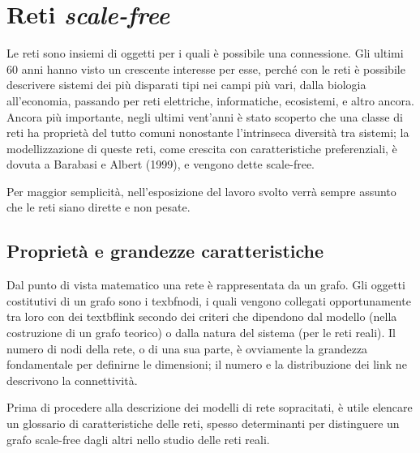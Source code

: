 
\section{Reti \emph{scale-free}}
\label{sec:teoria}
Le reti sono insiemi di oggetti per i quali è possibile una connessione. Gli ultimi 60 anni hanno visto un crescente interesse per esse, perché con le reti è possibile descrivere sistemi dei più disparati tipi nei campi più vari, dalla biologia all'economia, passando per reti elettriche, informatiche, ecosistemi,  e altro ancora. Ancora più importante, negli ultimi vent'anni è stato scoperto che una classe di reti ha proprietà del tutto comuni nonostante l'intrinseca diversità tra sistemi; la modellizzazione di queste reti, come crescita con caratteristiche preferenziali, è dovuta a Barabasi e Albert (1999), e vengono dette scale-free.

Per maggior semplicità, nell'esposizione del lavoro svolto verrà sempre assunto che le reti siano dirette e non pesate.

\subsection{Proprietà e grandezze caratteristiche}
Dal punto di vista matematico una rete è rappresentata da un grafo. Gli oggetti costitutivi di un grafo sono i texbf{nodi}, i quali vengono collegati opportunamente tra loro con dei textbf{link} secondo dei criteri che dipendono dal modello (nella costruzione di un grafo teorico) o dalla natura del sistema (per le reti reali). Il numero di nodi della rete, o di una sua parte, è ovviamente la grandezza fondamentale per definirne le dimensioni; il numero e la distribuzione dei link ne descrivono la connettività.

Prima di procedere alla descrizione dei modelli di rete sopracitati, è utile elencare un glossario di caratteristiche delle reti, spesso determinanti per distinguere un grafo scale-free dagli altri nello studio delle reti reali.

